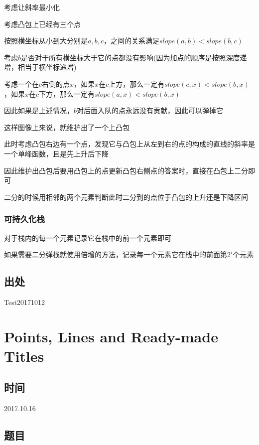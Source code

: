 \documentclass[a4paper]{article}
\begin{document}
		考虑让斜率最小化
		
		考虑凸包上已经有三个点
		
		按照横坐标从小到大分别是$a,b,c$，之间的关系满足$slope(a,b)<slope(b,c)$
		
		考虑$b$是否对于所有横坐标大于它的点都没有影响(因为加点的顺序是按照深度递增，相当于横坐标递增)
		
		考虑一个在$c$右侧的点$x$，如果$x$在$c$上方，那么一定有$slope(c,x)<slope(b,x)$，如果$x$在$c$下方，那么一定有$slope(a,x)<slope(b,x)$
		
		因此如果是上述情况，$b$对后面入队的点永远没有贡献，因此可以弹掉它
		
		这样图像上来说，就维护出了一个上凸包
		
		此时考虑凸包右边有一个点，发现它与凸包上从左到右的点的构成的直线的斜率是一个单峰函数，且是先上升后下降
		
		因此维护出凸包后要用凸包上的点更新凸包右侧点的答案时，直接在凸包上二分即可
		
		二分的时候用相邻的两个元素判断此时二分到的点位于凸包的上升还是下降区间
		
		\subsubsection{可持久化栈}
		
		对于栈内的每一个元素记录它在栈中的前一个元素即可
		
		如果需要二分弹栈就使用倍增的方法，记录每一个元素它在栈中的前面第$2^i$个元素
		
	\subsection{出处}
		
		Test20171012
	
	\newpage
	
	\section{Points, Lines and Ready-made Titles}
		
	\subsection{时间}
		
		2017.10.16
		
	\subsection{题目}
		
\end{document}

